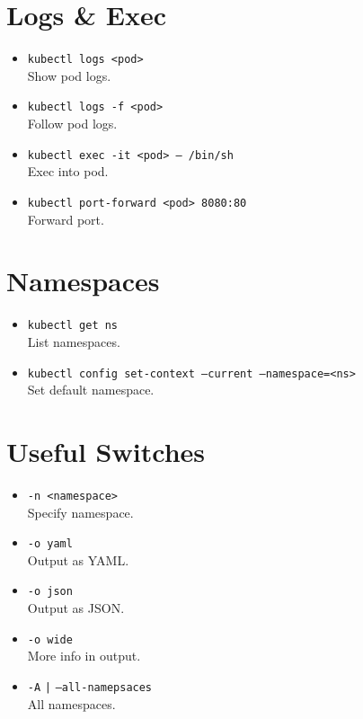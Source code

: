 \documentclass[a4paper,landscape]{article}
\begin{document}
\begin{multicols}{3}
\section*{Logs \& Exec}
\begin{itemize}
    \item \texttt{kubectl logs <pod>} \\
    Show pod logs.
    \item \texttt{kubectl logs -f <pod>} \\
    Follow pod logs.
    \item \texttt{kubectl exec -it <pod> -- /bin/sh} \\
    Exec into pod.
    \item \texttt{kubectl port-forward <pod> 8080:80} \\
    Forward port.
\end{itemize}

\section*{Namespaces}
\begin{itemize}
    \item \texttt{kubectl get ns} \\
    List namespaces.
    \item \texttt{kubectl config set-context --current --namespace=<ns>} \\
    Set default namespace.
\end{itemize}

\section*{Useful Switches}
\begin{itemize}
    \item \texttt{-n <namespace>} \\
    Specify namespace.
    \item \texttt{-o yaml} \\
    Output as YAML.
    \item \texttt{-o json} \\
    Output as JSON.
    \item \texttt{-o wide} \\
    More info in output.
    \item \texttt{-A} \texttt{|} \texttt{--all-namepsaces}\\
    All namespaces.
\end{itemize}

\end{multicols}
\end{document}
